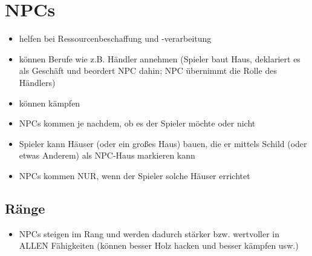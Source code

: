 \section{NPCs}
\label{sec:NPCs}
	\begin{itemize}
		\item helfen bei Ressourcenbeschaffung und -verarbeitung
		\item können Berufe wie z.B. Händler annehmen
		(Spieler baut Haus, deklariert es als Geschäft und beordert NPC dahin; NPC übernimmt die Rolle des Händlers)
		\item können kämpfen
		\item NPCs kommen je nachdem, ob es der Spieler möchte oder nicht
		\item Spieler kann Häuser (oder ein großes Haus) bauen, die er mittels Schild (oder etwas Anderem) als NPC-Haus markieren kann
		\item NPCs kommen NUR, wenn der Spieler solche Häuser errichtet
	\end{itemize}

\subsection{Ränge}
\label{subsec:raenge}
	\begin{itemize}
		\item NPCs steigen im Rang und werden dadurch stärker bzw. wertvoller in ALLEN Fähigkeiten (können besser Holz hacken und besser kämpfen usw.)
	\end{itemize}



